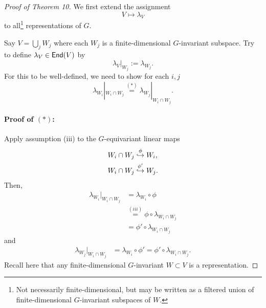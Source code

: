 \begin{proof}[Proof of Theorem 10]
We first extend the assignment
\[ V \mapsto \lambda_V \]
to all\footnote{Not necessarily finite-dimensional, but may be written as a filtered union of finite-dimensional $G$-invariant subspaces of $W$.} representations of $G$.

Say $V = \bigcup_{j} W_j$ where each $W_j$ is a finite-dimensional $G$-invariant subspace. Try to define $\lambda_V \in  \textsf{End}(V)$ by 
\[ \lambda_V|_{W_j} := \lambda_{W_j}. \]
For this to be well-defined, we need to show for each $i,j$
\[ \lambda_{W_i}|_{W_i \cap W_j} \overset{(*)}{=} \lambda_{W_j}|_{W_i \cap W_j}. \]

\paragraph{Proof of $(*)$:} Apply assumption (iii) to the $G$-equivariant linear maps
\begin{align*}
W_i \cap W_j &\overset{\phi}{\hookrightarrow} W_i,\\
W_i \cap W_j &\overset{\phi'}{\hookrightarrow} W_j.\\
\end{align*}
Then,
\begin{align*}
\lambda_{W_i} |_{W_i \cap W_j} & = \lambda_{W_i} \circ \phi \\
&\overset{(iii)}{=} \phi\circ \lambda_{W_i \cap W_j} \\
&= \phi'\circ \lambda_{W_i \cap W_j}
\end{align*}
and
\begin{align*}
\lambda_{W_j} |_{W_i \cap W_j} & = \lambda_{W_i} \circ \phi' =  \phi'\circ \lambda_{W_i \cap W_j}.
\end{align*}
Recall here that any finite-dimensional $G$-invariant $W\subset V$ is a representation.
\renewcommand{\qedsymbol}{$\ldots$}
\end{proof}

